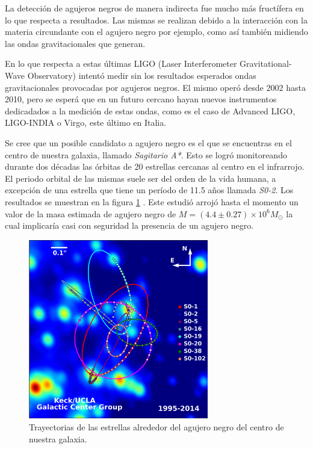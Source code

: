 \documentclass[12pt]{article}
\theoremstyle{plain}
\begin{document}
La detección de agujeros negros de manera indirecta fue mucho más fructífera en lo que respecta a resultados. Las mismas se realizan debido a la interacción con la materia circundante con el agujero negro por ejemplo, como así también midiendo las ondas gravitacionales que generan.

En lo que respecta a estas últimas LIGO (Laser Interferometer Gravitational-Wave Observatory) \cite{ligo} intentó medir sin los resultados esperados ondas gravitacionales provocadas por agujeros negros. El mismo operó desde 2002 hasta 2010, pero se esperá que en un futuro cercano hayan nuevos instrumentos dedicadados a la medición de estas ondas, como es el caso de Advanced LIGO, LIGO-INDIA o Virgo, este último en Italia.

Se cree que un posible candidato a agujero negro es el que se encuentras en el centro de nuestra galaxia, llamado \textit{Sagitario A*}. Esto se logró monitoreando durante dos décadas las órbitas de 20 estrellas cercanas al centro en el infrarrojo. El periodo orbital de las mismas suele ser del orden de la vida humana, a excepción de una estrella que tiene un período de 11.5 años llamada \textit{S0-2}. Los resultados se muestran en la figura \ref{sgtaa} . Este estudió arrojó hasta el momento un valor de la masa estimada de agujero negro de $M=(4.4 \pm 0.27)\times 10^6 M_{\odot}$ la cual implicaría casi con seguridad la presencia de un agujero negro.

\begin{figure}[H]
\centering
\includegraphics[width=0.7\textwidth]{sgta.jpg}
\caption{Trayectorias de las estrellas alrededor del agujero negro del centro de nuestra galaxia.}
\label{sgtaa}
\end{figure}
\end{document}
